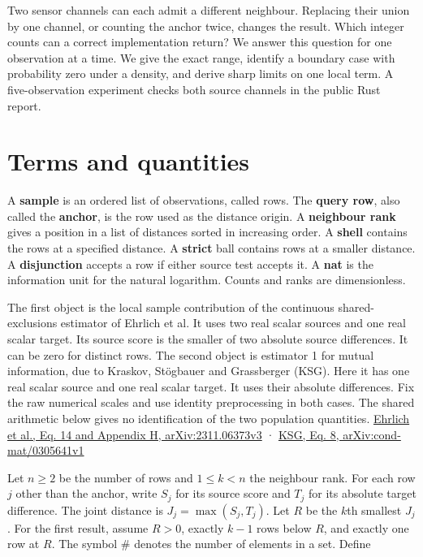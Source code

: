 Two sensor channels can each admit a different neighbour. Replacing their union by one channel, or counting the anchor twice, changes the result. Which integer counts can a correct implementation return? We answer this question for one observation at a time. We give the exact range, identify a boundary case with probability zero under a density, and derive sharp limits on one local term. A five-observation experiment checks both source channels in the public Rust report.

\section{Terms and quantities}\label{terms-and-quantities}

A \textbf{sample} is an ordered list of observations, called rows. The \textbf{query row}, also called the \textbf{anchor}, is the row used as the distance origin. A \textbf{neighbour rank} gives a position in a list of distances sorted in increasing order. A \textbf{shell} contains the rows at a specified distance. A \textbf{strict} ball contains rows at a smaller distance. A \textbf{disjunction} accepts a row if either source test accepts it. A \textbf{nat} is the information unit for the natural logarithm. Counts and ranks are dimensionless.

The first object is the local sample contribution of the continuous shared-exclusions estimator of Ehrlich et al. It uses two real scalar sources and one real scalar target. Its source score is the smaller of two absolute source differences. It can be zero for distinct rows. The second object is estimator 1 for mutual information, due to Kraskov, Stögbauer and Grassberger (KSG). Here it has one real scalar source and one real scalar target. It uses their absolute differences. Fix the raw numerical scales and use identity preprocessing in both cases. The shared arithmetic below gives no identification of the two population quantities. \href{https://arxiv.org/html/2311.06373v3}{Ehrlich et al., Eq. 14 and Appendix H, arXiv:2311.06373v3} · \href{https://arxiv.org/html/cond-mat/0305641v1}{KSG, Eq. 8, arXiv:cond-mat/0305641v1}

\clearpage

Let \(n\ge2\) be the number of rows and \(1\le k<n\) the neighbour rank. For each row \(j\) other than the anchor, write \(S_j\) for its source score and \(T_j\) for its absolute target difference. The joint distance is \(J_j=\max(S_j,T_j)\). Let \(R\) be the \(k\)th smallest \(J_j\). For the first result, assume \(R>0\), exactly \(k-1\) rows below \(R\), and exactly one row at \(R\). The symbol \(\#\) denotes the number of elements in a set. Define

